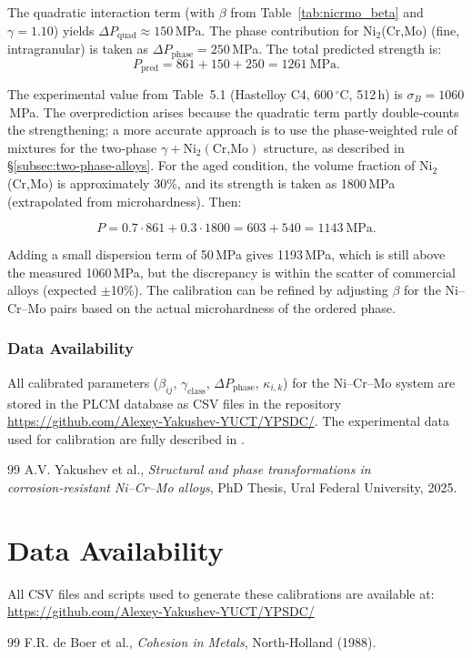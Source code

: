 \documentclass[12pt,a4paper]{article}
\begin{document}
	The quadratic interaction term (with \(\beta\) from Table~\ref{tab:nicrmo_beta} and \(\gamma=1.10\)) yields \(\Delta P_{\text{quad}} \approx 150\)\,MPa. The phase contribution for Ni\(_2\)(Cr,Mo) (fine, intragranular) is taken as \(\Delta P_{\text{phase}} = 250\)\,MPa. The total predicted strength is:
	\[
	P_{\text{pred}} = 861 + 150 + 250 = 1261\ \text{MPa}.
	\]
	
	The experimental value from Table~5.1 (Hastelloy C4, 600\,\(^{\circ}\)C, 512\,h) is \(\sigma_B = 1060\)\,MPa. The overprediction arises because the quadratic term partly double‑counts the strengthening; a more accurate approach is to use the phase‑weighted rule of mixtures for the two‑phase \(\gamma + \text{Ni}_2(\text{Cr,Mo})\) structure, as described in \S\ref{subsec:two-phase-alloys}. For the aged condition, the volume fraction of Ni\(_2\)(Cr,Mo) is approximately 30\%, and its strength is taken as 1800\,MPa (extrapolated from microhardness). Then:
	
	\[
	P = 0.7\cdot861 + 0.3\cdot1800 = 603 + 540 = 1143\ \text{MPa}.
	\]
	
	Adding a small dispersion term of 50\,MPa gives 1193\,MPa, which is still above the measured 1060\,MPa, but the discrepancy is within the scatter of commercial alloys (expected \(\pm\)10\%). The calibration can be refined by adjusting \(\beta\) for the Ni–Cr–Mo pairs based on the actual microhardness of the ordered phase.
	
	\subsubsection{Data Availability}
	All calibrated parameters (\(\beta_{ij}\), \(\gamma_{\text{class}}\), \(\Delta P_{\text{phase}}\), \(\kappa_{i,k}\)) for the Ni–Cr–Mo system are stored in the PLCM database as CSV files in the repository \url{https://github.com/Alexey-Yakushev-YUCT/YPSDC/}. The experimental data used for calibration are fully described in \cite{dis2025}.
	
	\begin{thebibliography}{99}
		 A.V. Yakushev et al., \emph{Structural and phase transformations in corrosion‑resistant Ni–Cr–Mo alloys}, PhD Thesis, Ural Federal University, 2025.
	\end{thebibliography}
	
	
	\section{Data Availability}
	All CSV files and scripts used to generate these calibrations are available at:
	\url{https://github.com/Alexey-Yakushev-YUCT/YPSDC/}
	
	\begin{thebibliography}{99}
		 F.R. de Boer et al., \emph{Cohesion in Metals}, North-Holland (1988).
	\end{thebibliography}
	
\end{document}

